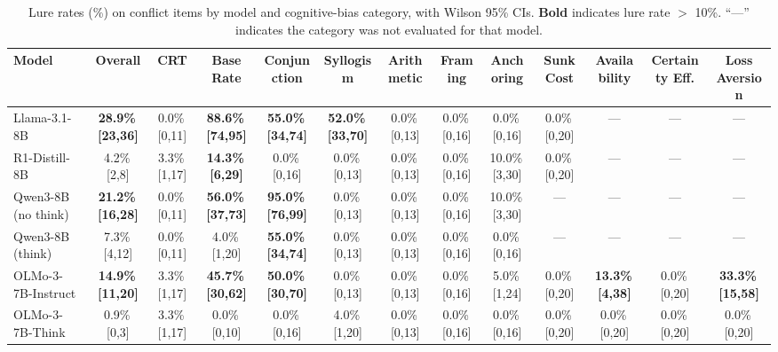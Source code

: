 \begin{table}[t]
\centering
\caption{Lure rates (\%) on conflict items by model and cognitive-bias category, with Wilson 95\% CIs. \textbf{Bold} indicates lure rate $>$ 10\%. ``---'' indicates the category was not evaluated for that model.}
\label{tab:behavioral-full}
\footnotesize
\setlength{\tabcolsep}{3.5pt}
\begin{tabular}{l c c c c c c c c c c c c}
\toprule
Model & Overall & CRT & Base Rate & Conjunction & Syllogism & Arithmetic & Framing & Anchoring & Sunk Cost & Availability & Certainty Eff. & Loss Aversion \\
\midrule
Llama-3.1-8B & \textbf{28.9\%\,{\tiny [23,36]}} & 0.0\%\,{\tiny [0,11]} & \textbf{88.6\%\,{\tiny [74,95]}} & \textbf{55.0\%\,{\tiny [34,74]}} & \textbf{52.0\%\,{\tiny [33,70]}} & 0.0\%\,{\tiny [0,13]} & 0.0\%\,{\tiny [0,16]} & 0.0\%\,{\tiny [0,16]} & 0.0\%\,{\tiny [0,20]} & --- & --- & --- \\
R1-Distill-8B & 4.2\%\,{\tiny [2,8]} & 3.3\%\,{\tiny [1,17]} & \textbf{14.3\%\,{\tiny [6,29]}} & 0.0\%\,{\tiny [0,16]} & 0.0\%\,{\tiny [0,13]} & 0.0\%\,{\tiny [0,13]} & 0.0\%\,{\tiny [0,16]} & 10.0\%\,{\tiny [3,30]} & 0.0\%\,{\tiny [0,20]} & --- & --- & --- \\
Qwen3-8B {\small(no think)} & \textbf{21.2\%\,{\tiny [16,28]}} & 0.0\%\,{\tiny [0,11]} & \textbf{56.0\%\,{\tiny [37,73]}} & \textbf{95.0\%\,{\tiny [76,99]}} & 0.0\%\,{\tiny [0,13]} & 0.0\%\,{\tiny [0,13]} & 0.0\%\,{\tiny [0,16]} & 10.0\%\,{\tiny [3,30]} & --- & --- & --- & --- \\
Qwen3-8B {\small(think)} & 7.3\%\,{\tiny [4,12]} & 0.0\%\,{\tiny [0,11]} & 4.0\%\,{\tiny [1,20]} & \textbf{55.0\%\,{\tiny [34,74]}} & 0.0\%\,{\tiny [0,13]} & 0.0\%\,{\tiny [0,13]} & 0.0\%\,{\tiny [0,16]} & 0.0\%\,{\tiny [0,16]} & --- & --- & --- & --- \\
OLMo-3-7B-Instruct & \textbf{14.9\%\,{\tiny [11,20]}} & 3.3\%\,{\tiny [1,17]} & \textbf{45.7\%\,{\tiny [30,62]}} & \textbf{50.0\%\,{\tiny [30,70]}} & 0.0\%\,{\tiny [0,13]} & 0.0\%\,{\tiny [0,13]} & 0.0\%\,{\tiny [0,16]} & 5.0\%\,{\tiny [1,24]} & 0.0\%\,{\tiny [0,20]} & \textbf{13.3\%\,{\tiny [4,38]}} & 0.0\%\,{\tiny [0,20]} & \textbf{33.3\%\,{\tiny [15,58]}} \\
OLMo-3-7B-Think & 0.9\%\,{\tiny [0,3]} & 3.3\%\,{\tiny [1,17]} & 0.0\%\,{\tiny [0,10]} & 0.0\%\,{\tiny [0,16]} & 4.0\%\,{\tiny [1,20]} & 0.0\%\,{\tiny [0,13]} & 0.0\%\,{\tiny [0,16]} & 0.0\%\,{\tiny [0,16]} & 0.0\%\,{\tiny [0,20]} & 0.0\%\,{\tiny [0,20]} & 0.0\%\,{\tiny [0,20]} & 0.0\%\,{\tiny [0,20]} \\
\bottomrule
\end{tabular}
\end{table}
